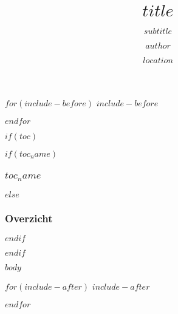 \documentclass[
  hyperref={colorlinks=true,citecolor=link.colour,linkcolor=white,urlcolor=link.colour},
  $if(fontsize)$$fontsize$$else$10pt$endif$,
  xetex,
  noamsthm$if(handout)$, handout$endif$$if(aspect)$, aspectratio=$aspect$ $endif$
]{beamer}
\title{$title$}
\subtitle{$subtitle$}
\author{$author$}
\institute{$institute$}
\date{$location$}
\date{}
\begin{document}
\begin{frame}[plain, label=intro, noframenumbering]
  \titlepage
\end{frame}

$for(include-before)$
$include-before$

$endfor$

$if(toc)$
\begin{frame}
$if(toc_name)$
  \frametitle{$toc_name$}
$else$
  \frametitle{Overzicht}
$endif$
	\tableofcontents
\end{frame}
$endif$

$body$

$for(include-after)$
$include-after$

$endfor$
\end{document}
